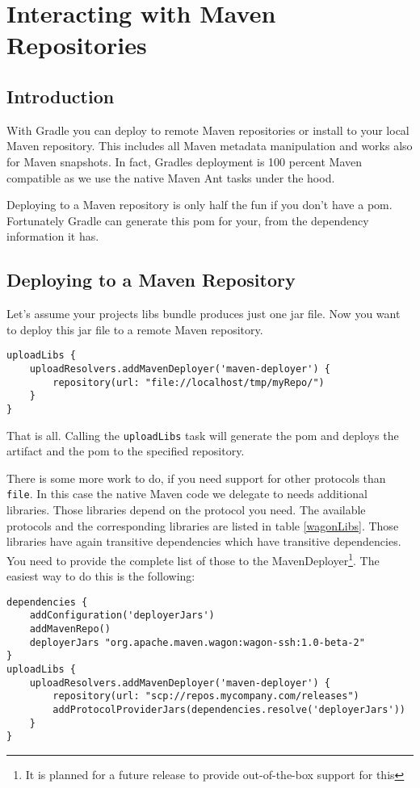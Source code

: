 \chapter{Interacting with Maven Repositories} %
\label{cha:interacting_with_maven_repositories}
\section{Introduction} %
\label{sec:introduction}
With Gradle you can deploy to remote Maven repositories or install to your local Maven repository. This includes all Maven metadata manipulation and works also for Maven snapshots. In fact, Gradles deployment is 100 percent Maven compatible as we use the native Maven Ant tasks under the hood.

Deploying to a Maven repository is only half the fun if you don't have a pom. Fortunately Gradle can generate this pom for your, from the dependency information it has. 

\section{Deploying to a Maven Repository} %
\label{sec:deploying_to_a_maven_repository}
Let's assume your projects libs bundle produces just one jar file. Now you want to deploy this jar file to a remote Maven repository.
\begin{Verbatim}
uploadLibs {
    uploadResolvers.addMavenDeployer('maven-deployer') {
        repository(url: "file://localhost/tmp/myRepo/")
    }
}
\end{Verbatim}
That is all. Calling the \texttt{uploadLibs} task will generate the pom and deploys the artifact and the pom to the specified repository. 

There is some more work to do, if you need support for other protocols than \texttt{file}. In this case the native Maven code we delegate to needs additional libraries. Those libraries depend on the protocol you need. The available protocols and the corresponding libraries are listed in table \ref{wagonLibs}. Those libraries have again transitive dependencies which have transitive dependencies. You need to provide the complete list of those to the MavenDeployer{\footnote{It is planned for a future release to provide out-of-the-box support for this}}. The easiest way to do this is the following:
\begin{Verbatim}
dependencies {
    addConfiguration('deployerJars')
	addMavenRepo()
	deployerJars "org.apache.maven.wagon:wagon-ssh:1.0-beta-2"
}
uploadLibs {
    uploadResolvers.addMavenDeployer('maven-deployer') {
        repository(url: "scp://repos.mycompany.com/releases")
        addProtocolProviderJars(dependencies.resolve('deployerJars'))
    }
}
\end{Verbatim}

